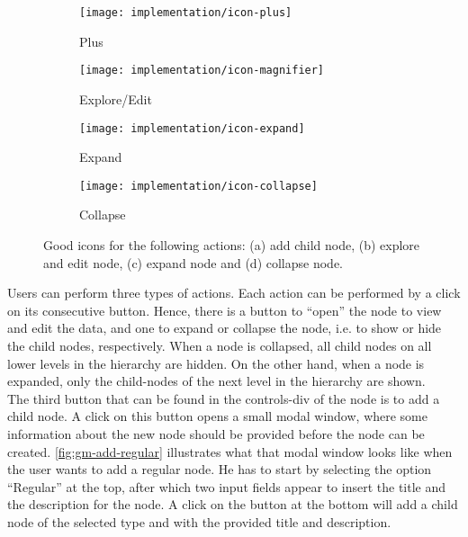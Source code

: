 \begin{figure}[H]
	\centering
	\begin{subfigure}{.2\textwidth}
  		\centering
  		\texttt{[image: implementation/icon-plus]}
  		\caption{Plus}
  		\label{fig:plusicon}
	\end{subfigure}%
	\begin{subfigure}{.2\textwidth}
  		\centering
  		\texttt{[image: implementation/icon-magnifier]}
  		\caption{Explore/Edit}
  		\label{fig:editicon}
	\end{subfigure}
	\begin{subfigure}{.2\textwidth}
		\centering
  		\texttt{[image: implementation/icon-expand]}
  		\caption{Expand}
  		\label{fig:expandicon}
	\end{subfigure}
	\begin{subfigure}{.2\textwidth}
  		\centering
  		\texttt{[image: implementation/icon-collapse]}
  		\caption{Collapse}
  		\label{fig:collapseicon}
	\end{subfigure}
	\caption{Good icons for the following actions: (a) add child node, (b) explore and edit node, (c) expand node and (d) collapse node.}
	\label{fig:icons}
\end{figure}

Users can perform three types of actions. Each action can be performed by a click on its consecutive button. Hence, there is a button to ``open'' the node to view and edit the data, and one to expand or collapse the node, i.e. to show or hide the child nodes, respectively. When a node is collapsed, all child nodes on all lower levels in the hierarchy are hidden. On the other hand, when a node is expanded, only the child-nodes of the next level in the hierarchy are shown.\\

The third button that can be found in the controls-div of the node is to add a child node. A click on this button opens a small modal window, where some information about the new node should be provided before the node can be created. \autoref{fig:gm-add-regular} illustrates what that modal window looks like when the user wants to add a regular node. He has to start by selecting the option ``Regular'' at the top, after which two input fields appear to insert the title and the description for the node. A click on the button at the bottom will add a child node of the selected type and with the provided title and description.\\

